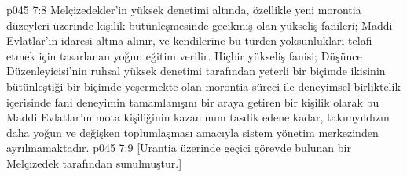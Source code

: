 \vs p045 7:8 Melçizedekler’in yüksek denetimi altında, özellikle yeni morontia düzeyleri üzerinde kişilik bütünleşmesinde gecikmiş olan yükseliş fanileri; Maddi Evlatlar’ın idaresi altına alınır, ve kendilerine bu türden yoksunlukları telafi etmek için tasarlanan yoğun eğitim verilir. Hiçbir yükseliş fanisi; Düşünce Düzenleyicisi’nin ruhsal yüksek denetimi tarafından yeterli bir biçimde ikisinin bütünleştiği bir biçimde yeşermekte olan morontia süreci ile deneyimsel birliktelik içerisinde fani deneyimin tamamlanışını bir araya getiren bir kişilik olarak bu Maddi Evlatlar’ın mota kişiliğinin kazanımını tasdik edene kadar, takımyıldızın daha yoğun ve değişken toplumlaşması amacıyla sistem yönetim merkezinden ayrılmamaktadır.
\vs p045 7:9 [Urantia üzerinde geçici görevde bulunan bir Melçizedek tarafından sunulmuştur.]
